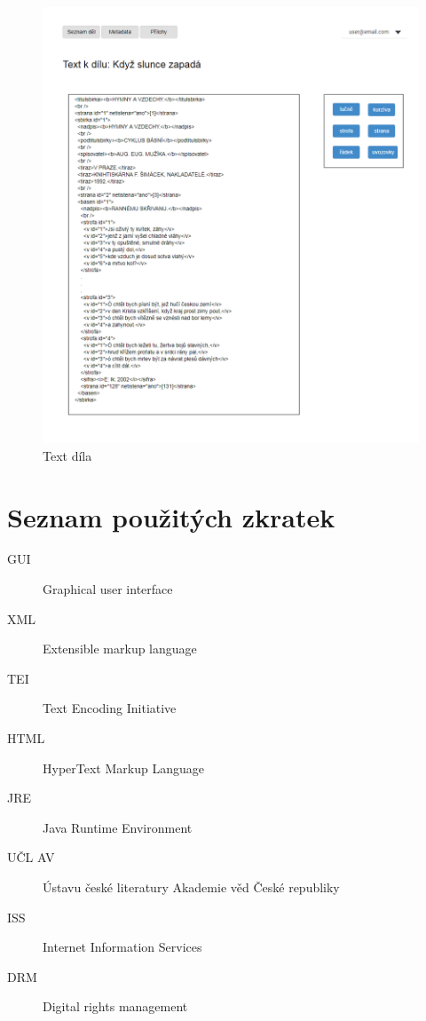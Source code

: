 \documentclass[thesis=B,czech]{FITthesis}[2012/06/26]
\begin{document}
    \begin {figure}[H]\centering
        \includegraphics[width=\textwidth]{images/text}
        \caption {Text díla}
        \label {fig:text}
    \end{figure}
    
\chapter{Seznam použitých zkratek}
\begin{description}
	\item[GUI] Graphical user interface
	\item[XML] Extensible markup language
	\item[TEI] Text Encoding Initiative
	\item[HTML] HyperText Markup Language
	\item[JRE] Java Runtime Environment
	\item[UČL AV] Ústavu české literatury Akademie věd České republiky
	\item[ISS] Internet Information Services
	\item[DRM] Digital rights management
\end{description}
\end{document}
